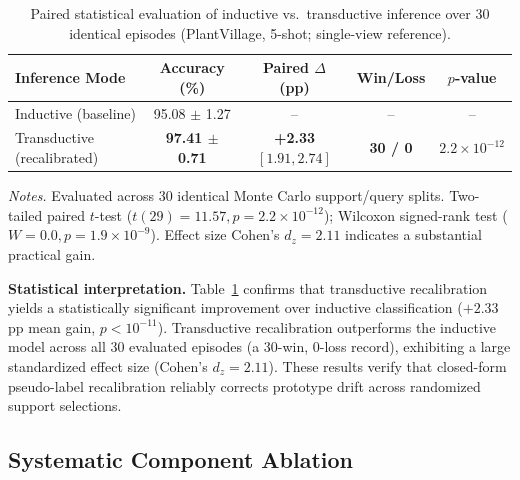 \begin{table}[htbp]
\caption{Paired statistical evaluation of inductive vs.\ transductive inference over 30 identical episodes (PlantVillage, 5-shot; single-view reference).}
\label{tab:paired_test}
\centering

\footnotesize
\setlength{\tabcolsep}{3pt}
\begin{tabular*}{\columnwidth}{@{\extracolsep{\fill}}lcccc}
\toprule
\textbf{Inference Mode} & \textbf{Accuracy (\%)} & \textbf{Paired $\Delta$ (pp)} & \textbf{Win/Loss} & \textbf{$p$-value} \\
\midrule
Inductive (baseline) & 95.08 $\pm$ 1.27 & -- & -- & -- \\
Transductive (recalibrated) & \textbf{97.41 $\pm$ 0.71} & \textbf{+2.33} $[1.91, 2.74]$ & \textbf{30 / 0} & $2.2\times 10^{-12}$ \\
\bottomrule
\end{tabular*}

\vspace{3pt}
\begin{minipage}{\columnwidth}
\footnotesize
\textit{Notes.} Evaluated across 30 identical Monte Carlo support/query splits. Two-tailed paired $t$-test ($t(29)=11.57, p=2.2\times 10^{-12}$); Wilcoxon signed-rank test ($W=0.0, p=1.9\times 10^{-9}$). Effect size Cohen's $d_z = 2.11$ indicates a substantial practical gain.
\end{minipage}
\end{table}

\textbf{Statistical interpretation.} Table~\ref{tab:paired_test} confirms that transductive recalibration yields a statistically significant improvement over inductive classification ($+2.33$\,pp mean gain, $p < 10^{-11}$). Transductive recalibration outperforms the inductive model across all 30 evaluated episodes (a 30-win, 0-loss record), exhibiting a large standardized effect size (Cohen's $d_z = 2.11$). These results verify that closed-form pseudo-label recalibration reliably corrects prototype drift across randomized support selections.

\subsection{Systematic Component Ablation}
\label{sec:ablation}

